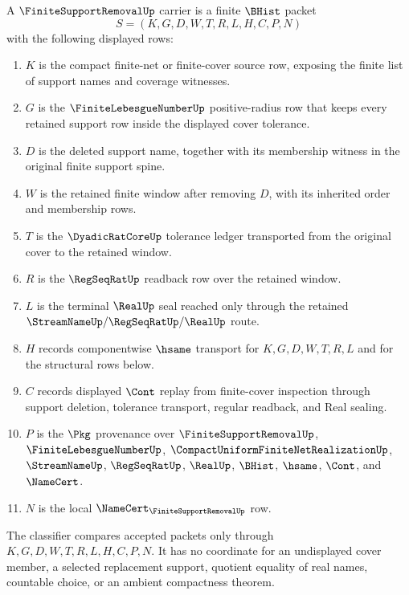 \begin{definition}
\label{def:finite-support-removal-carrier}
A $\FiniteSupportRemovalUp$ carrier is a finite $\BHist$ packet
$$
S=(K,G,D,W,T,R,L,H,C,P,N)
$$
with the following displayed rows:
\begin{enumerate}
\item $K$ is the compact finite-net or finite-cover source row, exposing the finite list of support names and coverage witnesses.
\item $G$ is the $\FiniteLebesgueNumberUp$ positive-radius row that keeps every retained support row inside the displayed cover tolerance.
\item $D$ is the deleted support name, together with its membership witness in the original finite support spine.
\item $W$ is the retained finite window after removing $D$, with its inherited order and membership rows.
\item $T$ is the $\DyadicRatCoreUp$ tolerance ledger transported from the original cover to the retained window.
\item $R$ is the $\RegSeqRatUp$ readback row over the retained window.
\item $L$ is the terminal $\RealUp$ seal reached only through the retained $\StreamNameUp/\RegSeqRatUp/\RealUp$ route.
\item $H$ records componentwise $\hsame$ transport for $K,G,D,W,T,R,L$ and for the structural rows below.
\item $C$ records displayed $\Cont$ replay from finite-cover inspection through support deletion, tolerance transport, regular readback, and Real sealing.
\item $P$ is the $\Pkg$ provenance over $\FiniteSupportRemovalUp$, $\FiniteLebesgueNumberUp$, $\CompactUniformFiniteNetRealizationUp$, $\StreamNameUp$, $\RegSeqRatUp$, $\RealUp$, $\BHist$, $\hsame$, $\Cont$, and $\NameCert$.
\item $N$ is the local $\NameCert_{\FiniteSupportRemovalUp}$ row.
\end{enumerate}
The classifier compares accepted packets only through $K,G,D,W,T,R,L,H,C,P,N$. It has no coordinate for an undisplayed cover member, a selected replacement support, quotient equality of real names, countable choice, or an ambient compactness theorem.
\end{definition}

